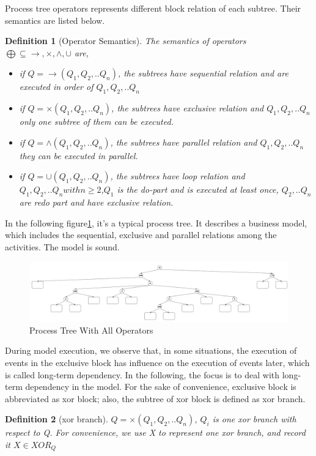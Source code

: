 \documentclass[]{article}
\newtheorem{mydef}{Definition}[section]
\begin{document}
Process tree operators represents different block relation of each subtree. Their semantics are listed below. 
\begin{mydef}[Operator Semantics] 
	The semantics of operators $\bigoplus \subseteq {\rightarrow, \times, \land, \cup}$ are,
	\begin{itemize}
		\item if $Q= \rightarrow(Q_1 , Q_2 ,.. Q_n)$, the subtrees have sequential relation and are executed in order of $Q_1,Q_2,..Q_n$
		\item if $Q= \times(Q_1 , Q_2 ,.. Q_n)$,  the subtrees have exclusive relation and $Q_1,Q_2,..Q_n$  only one subtree of them can be executed.
		\item if $Q= \land (Q_1 , Q_2 ,.. Q_n)$,  the subtrees have parallel relation and $Q_1,Q_2,..Q_n$ they can be executed in parallel.
		\item if $Q= \cup(Q_1 , Q_2 ,.. Q_n)$,  the subtrees have loop relation and $Q_1,Q_2,..Q_n with n\geq2$,$Q_1$ is the do-part and is executed at least once, $Q_2,..Q_n$ are redo part and have exclusive relation.
	\end{itemize}
\end{mydef}
In the following figure\ref{fig:not_nested_overview}, it's a typical process tree. It describes a business model, which includes the sequential, exclusive and parallel relations among the activities.  The model is sound. 
\begin{figure}[h!]
	\includegraphics[width=\textwidth]{PT01_Not_Nested_Overview.png}
	\caption{Process Tree With All Operators}
	\label{fig:not_nested_overview}
\end{figure}
During model execution, we observe that, in some situations, the execution of events in the exclusive block has influence on the execution of events later, which is called long-term dependency. In the following, the focus is to deal with long-term dependency in the model. 
For the sake of convenience, exclusive block is abbreviated as xor block; also, the subtree of xor block is defined as xor branch. 
\begin{mydef}[xor branch]
   $Q= \times(Q_1 , Q_2 ,.. Q_n)$, $Q_i$ is one xor branch with respect to Q. For convenience, we use X to represent one xor branch, and record it $X\in XOR_{Q}$
\end{mydef}
\end{document}

